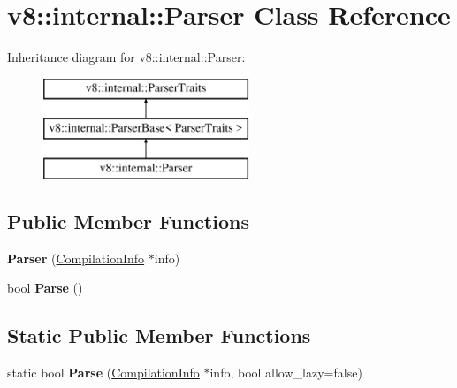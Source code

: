 \hypertarget{classv8_1_1internal_1_1_parser}{}\section{v8\+:\+:internal\+:\+:Parser Class Reference}
\label{classv8_1_1internal_1_1_parser}
Inheritance diagram for v8\+:\+:internal\+:\+:Parser\+:\begin{figure}[H]
\begin{center}
\leavevmode
\includegraphics[height=3.000000cm]{classv8_1_1internal_1_1_parser}
\end{center}
\end{figure}
\subsection*{Public Member Functions}
\begin{DoxyCompactItemize}
\item 
\hypertarget{classv8_1_1internal_1_1_parser_a3aa6cd6eeae99c202ab3d776f65b36b6}{}{\bfseries Parser} (\hyperlink{classv8_1_1internal_1_1_compilation_info}{Compilation\+Info} $\ast$info)\label{classv8_1_1internal_1_1_parser_a3aa6cd6eeae99c202ab3d776f65b36b6}

\item 
\hypertarget{classv8_1_1internal_1_1_parser_a009c86e24052b1992b0325c3ffa0f49e}{}bool {\bfseries Parse} ()\label{classv8_1_1internal_1_1_parser_a009c86e24052b1992b0325c3ffa0f49e}

\end{DoxyCompactItemize}
\subsection*{Static Public Member Functions}
\begin{DoxyCompactItemize}
\item 
\hypertarget{classv8_1_1internal_1_1_parser_ac964dfcbeeba5bc3498bc295ff88646b}{}static bool {\bfseries Parse} (\hyperlink{classv8_1_1internal_1_1_compilation_info}{Compilation\+Info} $\ast$info, bool allow\+\_\+lazy=false)\label{classv8_1_1internal_1_1_parser_ac964dfcbeeba5bc3498bc295ff88646b}

\end{DoxyCompactItemize}
